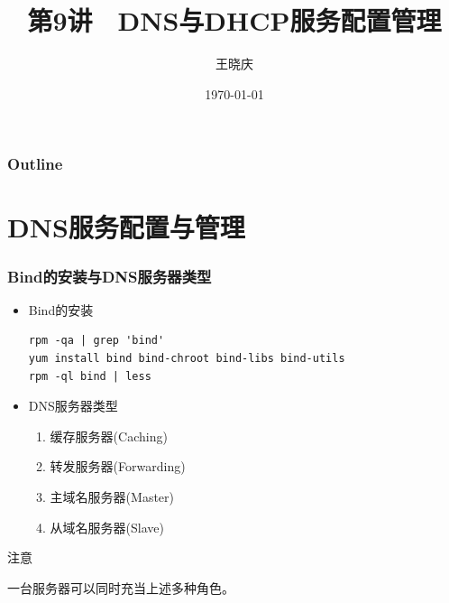 \documentclass[xcolor=svgnames,presentation]{beamer}
\title{第9讲　DNS与DHCP服务配置管理}
\author{王晓庆}
\date{\today}
\institute{wangxiaoqing@outlook.com}
\begin{document}
\maketitle

\begin{frame}
\frametitle{Outline}
\setcounter{tocdepth}{1}
\tableofcontents
\end{frame}
\section{DNS服务配置与管理}
\label{sec-1}
\begin{frame}[fragile]
\frametitle{Bind的安装与DNS服务器类型}
\label{sec-1-1}
\begin{itemize}

\item Bind的安装\\
\label{sec-1-1-1}%
\begin{verbatim}
rpm -qa | grep 'bind'
yum install bind bind-chroot bind-libs bind-utils
rpm -ql bind | less
\end{verbatim}

\item DNS服务器类型
\label{sec-1-1-2}%
\begin{enumerate}
\item 缓存服务器(Caching)
\item 转发服务器(Forwarding)
\item 主域名服务器(Master)
\item 从域名服务器(Slave)
\end{enumerate}
\end{itemize} %
\begin{block}{注意}
\label{sec-1-1-3}

一台服务器可以同时充当上述多种角色。
\end{block}
\end{frame}
\end{document}
